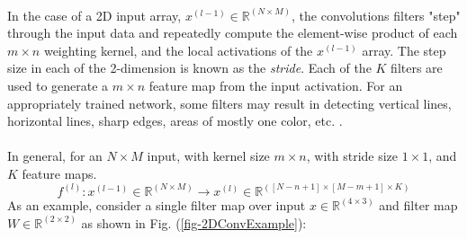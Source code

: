 \documentclass[12pt,letterpaper]{article}
\begin{document}
\paragraph*{}In the case of a 2D input array, $x^{(l-1)} \in \mathbb{R}^{(N \times M)}$, the convolutions filters "step" through the input data and repeatedly compute the element-wise product of each $m \times n$ weighting kernel, and the local activations of the $x^{(l-1)}$ array. The step size in each of the 2-dimension is known as the \textit{stride}. Each of the $K$ filters are used to generate a $m \times n$ feature map from the input activation. For an appropriately trained network, some filters may result in detecting vertical lines, horizontal lines, sharp edges, areas of mostly one color, etc. \cite{Geron,Loy}.

\paragraph*{}In general, for an $N \times M$ input, with kernel size $m \times n$, with stride size $1 \times 1$, and $K$ feature maps.
\begin{equation}
f^{(l)} : x^{(l-1)} \in \mathbb{R}^{(N \times M)} \rightarrow
x^{(l)} \in \mathbb{R}^{([N-n+1] \times [M-m+1] \times K)}
\end{equation}
As an example, consider a single filter map over input $x \in \mathbb{R}^{(4 \times 3)}$ and filter map $W \in \mathbb{R}^{(2 \times 2)}$ as shown in Fig. (\ref{fig-2DConvExample}):
\end{document}
